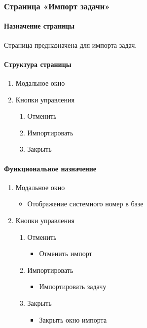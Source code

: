 \subsubsection{Страница «Импорт задачи»}
\paragraph{Назначение страницы}
Страница предназначена для импорта задач.

\paragraph{Структура страницы}
\begin{enumerate}
    \item Модальное окно
        \item Кнопки управления
        \begin{enumerate}
            \item Отменить
            \item Импортировать
            \item Закрыть
        \end{enumerate}
\end{enumerate}

\paragraph{Функциональное назначение}
\begin{enumerate}
    \item Модальное окно
    \begin{itemize}
        \item Отображение системного номер в базе
    \end{itemize}
    \item Кнопки управления
        \begin{enumerate}
            \item Отменить
                \begin{itemize}
                    \item Отменить импорт
                \end{itemize}

            \item Импортировать
                \begin{itemize}
                    \item Импортировать задачу
                \end{itemize}

            \item Закрыть
                \begin{itemize}
                    \item Закрыть окно импорта
                \end{itemize}
        \end{enumerate}
\end{enumerate}


